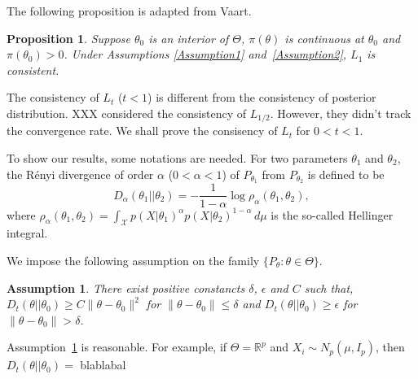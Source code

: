 \documentclass[3p]{elsarticle}
\theoremstyle{plain}
\newtheorem{proposition}{\quad\quad Proposition}
\newtheorem{assumption}{\quad\quad Assumption}
\theoremstyle{definition}
\theoremstyle{remark}
\begin{document}
The following proposition is adapted from Vaart.
\begin{proposition}
    Suppose $\theta_0$ is an interior of $\Theta$, $\pi(\theta)$ is continuous at $\theta_0$ and $\pi(\theta_0)>0$.
    Under Assumptions \ref{Assumption1} and~\ref{Assumption2}, $L_1$ is consistent.
\end{proposition}

The consistency of $L_t$ ($t<1$) is different from the consistency of posterior distribution.
XXX considered the consistency of $L_{1/2}$. However, they didn't track the convergence rate.
We shall prove the consisency of $L_{t}$ for $0<t<1$.

To show our results, some notations are needed. For two parameters $\theta_1$ and $\theta_2$, the R\'{e}nyi divergence of order $\alpha$ ($0<\alpha<1$) of $P_{\theta_1}$ from $P_{\theta_2}$ is defined to be
$$
D_{\alpha}(\theta_1||\theta_2)=-\frac{1}{1-\alpha}\log \rho_{\alpha}(\theta_1,\theta_2),
$$
where
$
\rho_{\alpha}(\theta_1,\theta_2)=\int_{\mathcal{X}} p(X|\theta_1)^{\alpha} p(X|\theta_2)^{1-\alpha} \, d \mu
$ is the so-called Hellinger integral.


We impose the following assumption on the family $\{P_{\theta}:\theta\in\Theta\}$.
\begin{assumption}\label{Assumption4}
    There exist positive constancts $\delta$, $\epsilon$ and $C$ such that,
     $D_{t}(\theta||\theta_0)  \geq  C \|\theta-\theta_0\|^2$ for $\|\theta-\theta_0\|\leq \delta$ and $D_{t}(\theta||\theta_0) \geq \epsilon$ for $\|\theta-\theta_0\|>\delta$.
\end{assumption}
Assumption~\ref{Assumption4} is reasonable.
For example, if $\Theta=\mathbb{R}^p$ and $X_i\sim N_p(\mu, I_p)$, then $D_t(\theta||\theta_0)=$
blablabal
\end{document}
